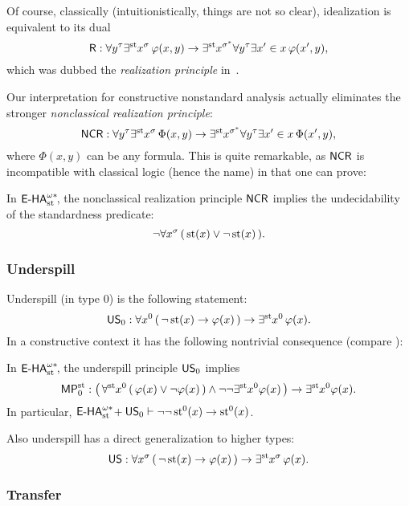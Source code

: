 Of course, classically (intuitionistically, things are not so clear), idealization is equivalent to its dual
\[ \textsf{\upshape R}: \forall y^\tau \exists^{\operatorname{st}{}}\! x^\sigma \, \varphi(x, y) \to \exists^{\operatorname{st}{}}\! x^{\sigma^*} \forall y^\tau \exists x' \in x \, \varphi(x', y), \]
which was dubbed the \emph{realization principle} in~\cite{BBS12}.

Our interpretation for constructive nonstandard analysis actually eliminates the stronger \emph{nonclassical realization principle}:
\[ \textsf{\upshape NCR}: \forall y^\tau \exists^{\operatorname{st}{}}\! x^\sigma \, \Phi(x, y) \to \exists^{\operatorname{st}{}}\! x^{\sigma^*} \forall y^\tau \exists x' \in x \, \Phi(x', y), \]
where $\Phi(x, y)$ can be any formula. This is quite remarkable, as $\textsf{\upshape NCR}$ is incompatible with classical logic (hence the name) in that one can prove:

\begin{prop}
In ${\textsf{\upshape E-HA}}^{\omega*}_{\operatorname{st}{}}\!$, the nonclassical realization principle $\textsf{\upshape NCR}$ implies the undecidability of the standardness predicate:
\[ \lnot \forall x^\sigma \, ( \, \operatorname{st}(x) \lor \lnot \operatorname{st}(x) \, ). \]
\end{prop}

\subsubsection*{Underspill}

Underspill (in type 0) is the following statement:
\[ \textsf{\upshape US}_0: \forall x^0 \, ( \, \lnot \operatorname{st}(x) \to \varphi(x) \, ) \to \exists^{\operatorname{st}{}}\! x^0 \, \varphi(x). \]
In a constructive context it has the following nontrivial consequence (compare \cite{avigadhelzner02}):

\begin{prop} \label{US_0impliesMP_0}
In ${\textsf{\upshape E-HA}}^{\omega*}_{\operatorname{st}{}}\!$, the underspill principle $\textsf{\upshape US}_0$ implies
\[ \textsf{\upshape MP}^{\operatorname{st}}_0: \big( \, \forall^{\operatorname{st}{}}\! x^0 \, ( \, \varphi(x) \lor \lnot \varphi(x) \, ) \land \lnot \lnot \exists^{\operatorname{st}{}}\! x^0 \varphi(x) \, \big) \to \exists^{\operatorname{st}{}}\! x^0 \varphi(x). \]
In particular, ${\textsf{\upshape E-HA}}^{\omega*}_{\operatorname{st}{}}\! + \textsf{\upshape US}_0 \vdash \lnot \lnot \operatorname{st}^0 (x) \to \operatorname{st}^0(x)$.
\end{prop}

Also underspill has a direct generalization to higher types:
\[ \textsf{\upshape US}: \forall x^\sigma \, ( \, \lnot \operatorname{st}(x) \to \varphi(x) \, ) \to \exists^{\operatorname{st}{}}\! x^\sigma \, \varphi(x). \]


\subsubsection*{Transfer}

